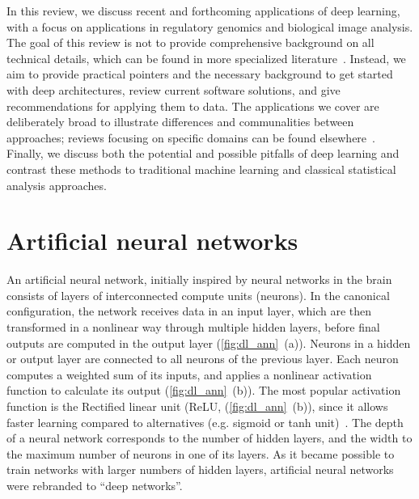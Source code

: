 In this review, we discuss recent and forthcoming applications of deep learning, with a focus on applications in regulatory genomics and biological image analysis. The goal of this review is not to provide comprehensive background on all technical details, which can be found in more specialized literature~\citep{bengio_practical_2012,bengio_representation_2013,deng_deep_2014,goodfellow_deep_2016,schmidhuber_deep_2015}. Instead, we aim to provide practical pointers and the necessary background to get started with deep architectures, review current software solutions, and give recommendations for applying them to data. The applications we cover are deliberately broad to illustrate differences and communalities between approaches; reviews focusing on specific domains can be found elsewhere~\citep{gawehn_deep_2016,leung_machine_2016,mamoshina_applications_2016,park_deep_2015}. Finally, we discuss both the potential and possible pitfalls of deep learning and contrast these methods to traditional machine learning and classical statistical analysis approaches.

\section{Artificial neural networks}
An artificial neural network, initially inspired by neural networks in the brain~\citep{farley_simulation_1954,mcculloch_logical_1943,rosenblatt_perceptron:_1958} consists of layers of interconnected compute units (neurons). In the canonical configuration, the network receives data in an input layer, which are then transformed in a nonlinear way through multiple hidden layers, before final outputs are computed in the output layer (\autoref{fig:dl_ann}~(a)). Neurons in a hidden or output layer are connected to all neurons of the previous layer. Each neuron computes a weighted sum of its inputs, and applies a nonlinear activation function to calculate its output (\autoref{fig:dl_ann}~(b)). The most popular activation function is the Rectified linear unit (ReLU, (\autoref{fig:dl_ann}~(b)), since it allows faster learning compared to alternatives (e.g. sigmoid or tanh unit)~\citep{glorot_deep_2011}. The depth of a neural network corresponds to the number of hidden layers, and the width to the maximum number of neurons in one of its layers. As it became possible to train networks with larger numbers of hidden layers, artificial neural networks were rebranded to ``deep networks''.

